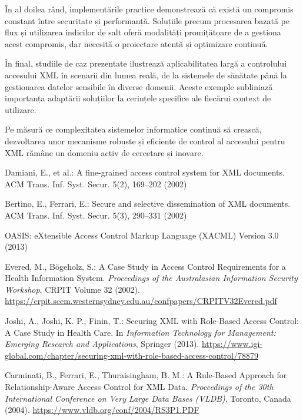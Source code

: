 \documentclass[runningheads]{llncs}
\begin{document}
\begin{spacing}{1.5}
În al doilea rând, implementările practice demonstrează că există un compromis constant între securitate și performanță. Soluțiile precum procesarea bazată pe flux și utilizarea indicilor de salt oferă modalități promițătoare de a gestiona acest compromis, dar necesită o proiectare atentă și optimizare continuă.

În final, studiile de caz prezentate ilustrează aplicabilitatea largă a controlului accesului XML în scenarii din lumea reală, de la sistemele de sănătate până la gestionarea datelor sensibile în diverse domenii. Aceste exemple subliniază importanța adaptării soluțiilor la cerințele specifice ale fiecărui context de utilizare.

Pe măsură ce complexitatea sistemelor informatice continuă să crească, dezvoltarea unor mecanisme robuste și eficiente de control al accesului pentru XML rămâne un domeniu activ de cercetare și inovare.


\begin{thebibliography}{9}

    Damiani, E., et al.: A fine-grained access control system for XML documents. ACM Trans. Inf. Syst. Secur. 5(2), 169--202 (2002)
    
    Bertino, E., Ferrari, E.: Secure and selective dissemination of XML documents. ACM Trans. Inf. Syst. Secur. 5(3), 290--331 (2002)
    
    OASIS: eXtensible Access Control Markup Language (XACML) Version 3.0 (2013)
    
    Evered, M., Bögeholz, S.: A Case Study in Access Control Requirements for a Health Information System. \textit{Proceedings of the Australasian Information Security Workshop}, CRPIT Volume 32 (2002). \url{https://crpit.scem.westernsydney.edu.au/confpapers/CRPITV32Evered.pdf}
    
    Joshi, A., Joshi, K. P., Finin, T.: Securing XML with Role-Based Access Control: A Case Study in Health Care. In \textit{Information Technology for Management: Emerging Research and Applications}, Springer (2013). \url{https://www.igi-global.com/chapter/securing-xml-with-role-based-access-control/78879}
    
    Carminati, B., Ferrari, E., Thuraisingham, B. M.: A Rule-Based Approach for Relationship-Aware Access Control for XML Data. \textit{Proceedings of the 30th International Conference on Very Large Data Bases (VLDB)}, Toronto, Canada (2004). \url{https://www.vldb.org/conf/2004/RS3P1.PDF}
    

\end{thebibliography}
\end{spacing}
\end{document}
